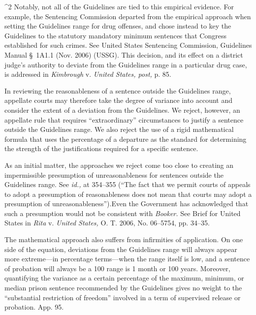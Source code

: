 ^2 Notably, not all of the Guidelines are tied to this empirical
evidence. For example, the Sentencing Commission departed from the
empirical approach when setting the Guidelines range for drug offenses,
and chose instead to key the Guidelines to the statutory mandatory
minimum sentences that Congress established for such crimes. See
United States Sentencing Commission, Guidelines Manual \S~1A1.1 (Nov.
2006) (USSG). This decision, and its effect on a district judge's
authority to deviate from the \newpage  Guidelines range in a particular
drug case, is addressed in \emph{Kimbrough} v. \emph{United States, post,}
p. 85.

  In reviewing the reasonableness of a sentence outside the Guidelines
range, appellate courts may therefore take the degree of variance into
account and consider the extent of a deviation from the Guidelines. We
reject, however, an appellate rule that requires ``extraordinary''
circumstances to justify a sentence outside the Guidelines range. We
also reject the use of a rigid mathematical formula that uses the
percentage of a departure as the standard for determining the strength
of the justifications required for a specific sentence.

  As an initial matter, the approaches we reject come too close
to creating an impermissible presumption of unreasonableness for
sentences outside the Guidelines range. See \emph{id.,} at 354--355
(``The fact that we permit courts of appeals to adopt a presumption
of reasonableness does not mean that courts may adopt a presumption of
unreasonableness'').\footnotemark[3] Even the Government has acknowledged that
such a presumption would not be consistent with \emph{Booker.} See Brief
for United States in \emph{Rita} v. \emph{United States,} O. T. 2006, No.
06--5754, pp. 34--35.

  The mathematical approach also suffers from infirmities of
application. On one side of the equation, deviations from \newpage  the
Guidelines range will always appear more extreme---in percentage
terms---when the range itself is low, and a sentence of probation
will always be a 100%
range is 1 month or 100 years. Moreover, quantifying the variance as a
certain percentage of the maximum, minimum, or median prison sentence
recommended by the Guidelines gives no weight to the ``substantial
restriction of freedom'' involved in a term of supervised release or
probation. App. 95.



